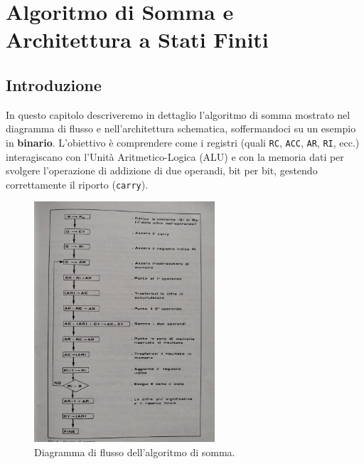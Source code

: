 \documentclass[a4paper,12pt]{report}
\begin{document}
\chapter{Algoritmo di Somma e Architettura a Stati Finiti}

\section{Introduzione}
In questo capitolo descriveremo in dettaglio l'algoritmo di somma mostrato nel diagramma di flusso e nell'architettura schematica, soffermandoci su un esempio in \textbf{binario}. L'obiettivo è comprendere come i registri (quali \texttt{RC}, \texttt{ACC}, \texttt{AR}, \texttt{RI}, ecc.) interagiscano con l'Unità Aritmetico-Logica (ALU) e con la memoria dati per svolgere l'operazione di addizione di due operandi, bit per bit, gestendo correttamente il riporto (\texttt{carry}).

\begin{figure}[ht]
    \centering
    \includegraphics[width=0.6\textwidth]{algoritmo.jpeg}
    \caption{Diagramma di flusso dell'algoritmo di somma.}
    \label{fig:algoritmo}
\end{figure}
\end{document}
